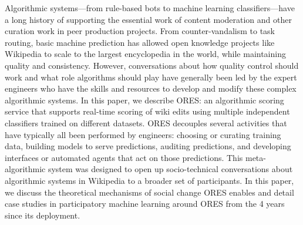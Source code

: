 Algorithmic systems---from rule-based bots to machine learning classifiers---have a long history of supporting the essential work of content moderation and other curation work in peer production projects.  From counter-vandalism to task routing, basic machine prediction has allowed open knowledge projects like Wikipedia to scale to the largest encyclopedia in the world, while maintaining quality and consistency.  However, conversations about how quality control should work and what role algorithms should play have generally been led by the expert engineers who have the skills and resources to develop and modify these complex algorithmic systems. In this paper, we describe ORES: an algorithmic scoring service that supports real-time scoring of wiki edits using multiple independent classifiers trained on different datasets. ORES decouples several activities that have typically all been performed by engineers: choosing or curating training data, building models to serve predictions, auditing predictions, and developing interfaces or automated agents that act on those predictions. This meta-algorithmic system was designed to open up socio-technical conversations about algorithmic systems in Wikipedia to a broader set of participants.  In this paper, we discuss the theoretical mechanisms of social change ORES enables and detail case studies in participatory machine learning around ORES from the 4 years since its deployment.
